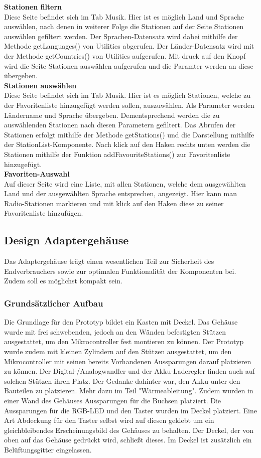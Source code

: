 \documentclass[]{article}
\begin{document}
\textbf{Stationen filtern} \\
Diese Seite befindet sich im Tab Musik. Hier ist es möglich Land und Sprache auswählen, nach denen in weiterer Folge die Stationen auf der Seite Stationen auswählen gefiltert werden. Der Sprachen-Datensatz wird dabei mithilfe der Methode getLanguages() von Utilities abgerufen. Der Länder-Datensatz wird mit der Methode getCountries() von Utilities aufgerufen. Mit druck auf den Knopf wird die Seite Stationen auswählen aufgerufen und die Paramter werden an diese übergeben. \newline \\
\textbf{Stationen auswählen} \\
Diese Seite befindet sich im Tab Musik. Hier ist es möglich Stationen, welche zu der Favoritenliste hinzugefügt werden sollen, auszuwählen. Als Parameter werden Ländername und Sprache übergeben. Dementsprechend werden die zu auswählenden Stationen nach diesen Parametern gefiltert. Das Abrufen der Stationen erfolgt mithilfe der Methode getStations() und die Darstellung mithilfe der StationList-Komponente. Nach klick auf den Haken rechts unten werden die Stationen mithilfe der Funktion addFavouriteStations() zur Favoritenliste hinzugefügt. \newline \\
\textbf{Favoriten-Auswahl} \\
Auf dieser Seite wird eine Liste, mit allen Stationen, welche dem ausgewählten Land und der ausgewählten Sprache entsprechen, angezeigt. Hier kann man Radio-Stationen markieren und mit klick auf den Haken diese zu seiner Favoritenliste hinzufügen. \newline \\
\subsection{Design Adaptergehäuse}
Das Adaptergehäuse trägt einen wesentlichen Teil zur Sicherheit des Endverbrauchers sowie zur optimalen Funktionalität der Komponenten bei. Zudem soll es möglichst kompakt sein.
\subsubsection{Grundsätzlicher Aufbau}
Die Grundlage für den Prototyp bildet ein Kasten mit Deckel.\newline
Das Gehäuse wurde mit frei schwebenden, jedoch an den Wänden befestigten Stützen ausgestattet, um den Mikrocontroller fest montieren zu können. Der Prototyp wurde zudem mit kleinen Zylindern auf den Stützen ausgestattet, um den Mikrocontroller mit seinen bereits Vorhandenen Aussparungen darauf platzieren zu können. Der Digital-/Analogwandler und der Akku-Laderegler finden auch auf solchen Stützen ihren Platz. Der Gedanke dahinter war, den Akku unter den Bauteilen zu platzieren. Mehr dazu im Teil "Wärmeableitung". Zudem wurden in einer Wand des Gehäuses Aussparungen für die Buchsen platziert. Die Aussparungen für die RGB-LED und den Taster wurden im Deckel platziert. Eine Art Abdeckung für den Taster selbst wird auf diesen geklebt um ein gleichbleibendes Erscheinungsbild des Gehäuses zu behalten. Der Deckel, der von oben auf das Gehäuse gedrückt wird, schließt dieses. Im Deckel ist zusätzlich ein Belüftungsgitter eingelassen.
\end{document}
